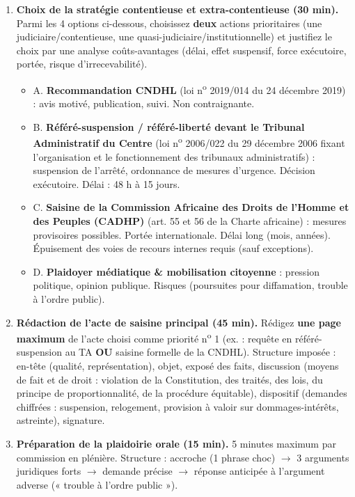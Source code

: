 \documentclass[11pt]{article}
\begin{document}
\begin{enumerate}
    \item \textbf{Choix de la stratégie contentieuse et extra-contentieuse (30 min).} Parmi les 4 options ci-dessous, choisissez \textbf{deux} actions prioritaires (une judiciaire/contentieuse, une quasi-judiciaire/institutionnelle) et justifiez le choix par une analyse coûts-avantages (délai, effet suspensif, force exécutoire, portée, risque d'irrecevabilité).
    \begin{itemize}
        \item A. \textbf{Recommandation CNDHL} (loi n\textsuperscript{o} 2019/014 du 24 décembre 2019) : avis motivé, publication, suivi. Non contraignante.
        \item B. \textbf{Référé-suspension / référé-liberté devant le Tribunal Administratif du Centre} (loi n\textsuperscript{o} 2006/022 du 29 décembre 2006 fixant l'organisation et le fonctionnement des tribunaux administratifs) : suspension de l'arrêté, ordonnance de mesures d'urgence. Décision exécutoire. Délai : 48 h à 15 jours.
        \item C. \textbf{Saisine de la Commission Africaine des Droits de l'Homme et des Peuples (CADHP)} (art. 55 et 56 de la Charte africaine) : mesures provisoires possibles. Portée internationale. Délai long (mois, années). Épuisement des voies de recours internes requis (sauf exceptions).
        \item D. \textbf{Plaidoyer médiatique \& mobilisation citoyenne} : pression politique, opinion publique. Risques (poursuites pour diffamation, trouble à l'ordre public).
    \end{itemize}

    \item \textbf{Rédaction de l'acte de saisine principal (45 min).} Rédigez \textbf{une page maximum} de l'acte choisi comme priorité n\textsuperscript{o} 1 (ex. : requête en référé-suspension au TA \textbf{OU} saisine formelle de la CNDHL). Structure imposée : en-tête (qualité, représentation), objet, exposé des faits, discussion (moyens de fait et de droit : violation de la Constitution, des traités, des lois, du principe de proportionnalité, de la procédure équitable), dispositif (demandes chiffrées : suspension, relogement, provision à valoir sur dommages-intérêts, astreinte), signature.

    \item \textbf{Préparation de la plaidoirie orale (15 min).} 5 minutes maximum par commission en plénière. Structure : accroche (1 phrase choc) $\rightarrow$ 3 arguments juridiques forts $\rightarrow$ demande précise $\rightarrow$ réponse anticipée à l'argument adverse (« trouble à l'ordre public »).
\end{enumerate}
\end{document}
